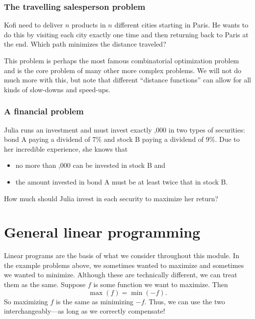 \documentclass[a4paper, 12pt]{article}
\numberwithin{equation}{section}
\numberwithin{figure}{section}
\theoremstyle{definition}
\begin{document}
\subsubsection{The travelling salesperson problem}

Kofi need to deliver $n$ products in $n$ different cities starting in Paris. He
wants to do this by visiting each city exactly one time and then returning back
to Paris at the end. Which path minimizes the distance traveled? 

This problem is perhaps the most famous combinatorial optimization problem and
is the core problem of many other more complex problems. We will not do much
more with this, but note that different ``distance functions'' can allow for all
kinds of slow-downs and speed-ups.

\subsubsection{A financial problem}

Julia runs an investment and must invest exactly ,000 in two types of
securities: bond \textsf{A} paying a dividend of 7\% and stock \textsf{B} paying
a dividend of 9\%. Due to her incredible experience, she knows that 
\begin{itemize}
	\item no more than ,000 can be invested in stock \textsf{B} and
	\item the amount invested in bond \textsf{A} must be at least twice that in
	stock \textsf{B}.
\end{itemize}
How much should Julia invest in each security to maximize her return?


\section{General linear programming}

Linear programs are the basis of what we consider throughout this module. In the
example problems above, we sometimes wanted to maximize and sometimes we wanted
to minimize. Although these are technically different, we can treat them as the
same. Suppose $f$ is some function we want to maximize. Then 
\[ 
	\max(f) = \min(-f).
\] 
So maximizing $f$ is the same as minimizing $-f$. Thus, we can use the two
interchangeably---as long as we correctly compensate!
\end{document}
